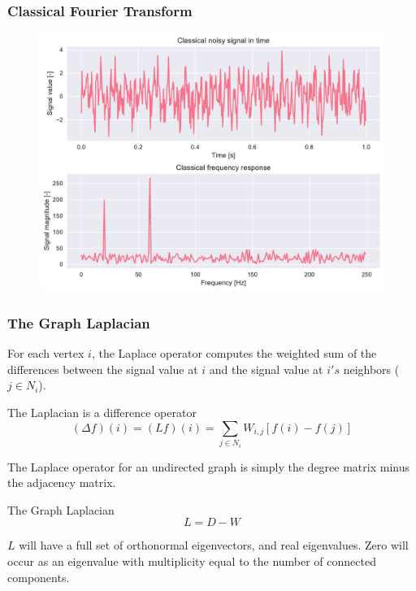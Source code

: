 \documentclass{beamer}
\begin{document}
\begin{frame}  
  \frametitle{Classical Fourier Transform}
\begin{figure}
\includegraphics[width=0.7\linewidth]{../img/graph_fourier_transform_0.pdf}
\end{figure}
\end{frame}


\begin{frame}
\frametitle{The Graph Laplacian}

For each vertex $i$, the Laplace operator computes the weighted sum of the
differences between the signal value at $i$ and the signal value at $i's$
neighbors ($j \in N_i$). 

\begin{block}{The Laplacian is a difference operator}
  \begin{equation}
    (\Delta f) (i) = (L f) (i) = \sum_{j \in N_i} W_{i, j} [f(i) - f(j)]
  \end{equation}
\end{block}

The Laplace operator for an undirected graph is simply the degree matrix minus the
adjacency matrix.

\begin{block}{The Graph Laplacian}
  \begin{equation}
    L = D - W
  \end{equation}
\end{block}

$L$ will have a full set of orthonormal eigenvectors, and real eigenvalues. Zero
will occur as an eigenvalue with multiplicity equal to the number of connected
components.
\end{frame}
\end{document}
